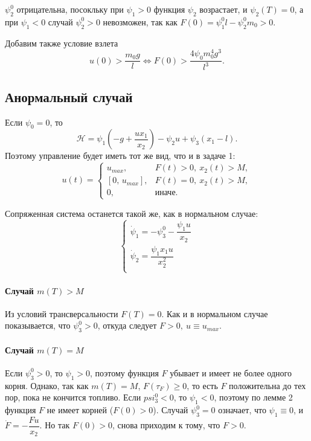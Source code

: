 \documentclass[16pt]{article}
\begin{document}
$\psi_2^0$ отрицательна, посокльку при $\psi_1 > 0$ функция $\psi_2$ возрастает, и $\psi_2(T) = 0$, а при
$\psi_1 < 0$ случай $\psi_2^0 > 0$ невозможен, так как $F(0) = \psi_1^0l - \psi_2^0m_0 > 0$.

Добавим также условие взлета
$$u(0) > \dfrac{m_0g}{l} \Leftrightarrow F(0) > \dfrac{4\psi_0m_0^4g^3}{l^3} .$$
\subsection{Анормальный случай}
Если $\psi_0 = 0$, то
$$\mathcal{H} = \psi_1(-g + \dfrac{ux_1}{x_2}) - \psi_2u + \psi_3(x_1-l).$$
Поэтому управление будет иметь тот же вид, что и в задаче 1:
 \begin{equation} \label{oc_1}
 u(t) = 
 \begin{cases}
 u_{max}, & F(t) > 0,\  x_2(t) > M, \\
 [0,\, u_{max}], & F(t) = 0, \ x_2(t) > M, \\
 0, &\text{иначе.}
 \end{cases}
 \end{equation}

Сопряженная система останется такой же, как в нормальном случае:
\begin{equation}
\begin{cases} 
\dot{\psi}_1 = -\psi_3^0 -\dfrac{\psi_1u}{x_2}\\
\dot{\psi}_2 = \dfrac{\psi_1 x_1 u}{x_2^2} \\
\end{cases}
\end{equation}

\paragraph{Случай $m(T) > M$}
Из условий трансверсальности $F(T) = 0$. Как и в нормальном случае показывается, что $\psi_3^0 > 0$, откуда следует
$F > 0, \ u \equiv u_{max}$.

\paragraph{Случай $m(T) = M$}
Если $\psi_3^0 > 0$, то $\psi_1 > 0$, поэтому функция $F$ убывает и имеет не более одного корня. Однако, так как 
$m(T) = M$, $F(\tau_F) \geqslant 0$, то есть $F$ положительна до тех пор, пока не кончится топливо. Если 
$psi_3^0 < 0$, то $\psi_1 < 0$, поэтому по лемме 2 функция $F$ не имеет корней ($F(0) > 0$). Случай $\psi_3^0 = 0$
означает, что $\psi_1 \equiv 0$, и $\dot{F} = -\dfrac{Fu}{x_2}$. Но так $F(0) > 0$, снова приходим к тому, 
что $F > 0$.
\end{document}
